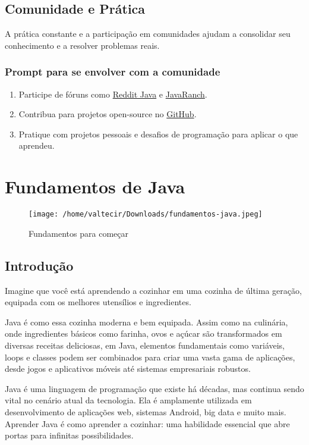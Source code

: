 \documentclass[a4paper,12pt]{book}
\begin{document}
\section{Comunidade e Prática}

A prática constante e a participação em comunidades ajudam a consolidar seu conhecimento e a resolver problemas reais.

\subsection{Prompt para se envolver com a comunidade}
\begin{enumerate}
    \item Participe de fóruns como \href{https://www.reddit.com/r/java/}{Reddit Java} e \href{https://www.javaranch.com/}{JavaRanch}.
    \item Contribua para projetos open-source no \href{https://github.com/}{GitHub}.
    \item Pratique com projetos pessoais e desafios de programação para aplicar o que aprendeu.
\end{enumerate}
\backmatter

\chapter{Fundamentos de Java}

\begin{figure}[H]
    \centering
    \texttt{[image: /home/valtecir/Downloads/fundamentos-java.jpeg]}
    \caption{Fundamentos para começar}
    \label{fig:exemplo}
\end{figure}

\section{Introdução}
Imagine que você está aprendendo a cozinhar em uma cozinha de última geração, equipada com os melhores utensílios e ingredientes. 

Java é como essa cozinha moderna e bem equipada. Assim como na culinária, onde ingredientes básicos como farinha, ovos e açúcar são transformados em diversas receitas deliciosas, em Java, elementos fundamentais como variáveis, loops e classes podem ser combinados para criar uma vasta gama de aplicações, desde jogos e aplicativos móveis até sistemas empresariais robustos.

Java é uma linguagem de programação que existe há décadas, mas continua sendo vital no cenário atual da tecnologia. Ela é amplamente utilizada em desenvolvimento de aplicações web, sistemas Android, big data e muito mais. Aprender Java é como aprender a cozinhar: uma habilidade essencial que abre portas para infinitas possibilidades.
\end{document}
